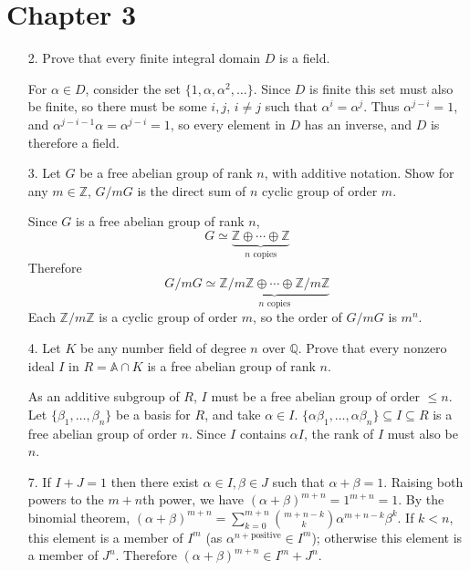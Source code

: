 \documentclass{article}
\newcommand{\Q}[0]{\mathbb{Q}}
\newcommand{\Z}[0]{\mathbb{Z}}
\newcommand{\ringofintegers}[1]{\mathbb{A} \cap #1}
\begin{document}
\section*{Chapter 3}

\begin{enumerate}
\item[2.] Prove that every finite integral domain $D$ is a field.

For $\alpha \in D$, consider the set $\{1, \alpha, \alpha^2, \ldots\}$.  Since $D$ is finite this set must also be finite, so there must be some $i, j$, $i \neq j$ such that $\alpha^i = \alpha^j$.  Thus $\alpha^{j - i} = 1$, and $\alpha^{j - i - 1}\alpha = \alpha^{j - i} = 1$, so every element in $D$ has an inverse, and $D$ is therefore a field.

\item[3.] Let $G$ be a free abelian group of rank $n$, with additive notation.  Show for any $m \in \Z$, $G / mG$ is the direct sum of $n$ cyclic group of order $m$.

Since $G$ is a free abelian group of rank $n$, \[ G \simeq \underbrace{\Z \oplus \cdots \oplus \Z}_\text{$n$ copies} \]
Therefore \[ G/mG \simeq \underbrace{\Z/m\Z \oplus \cdots \oplus \Z/m\Z}_\text{$n$ copies} \]
Each $\Z/m\Z$ is a cyclic group of order $m$, so the order of $G/mG$ is $m^n$.

\item[4.] Let $K$ be any number field of degree $n$ over $\Q$.  Prove that every nonzero ideal $I$ in $R = \ringofintegers{K}$ is a free abelian group of rank $n$.

As an additive subgroup of $R$, $I$ must be a free abelian group of order $\le n$.  Let $\{\beta_1, \ldots, \beta_n\}$ be a basis for $R$, and take $\alpha \in I$.  $\{\alpha\beta_1, \ldots, \alpha\beta_n\} \subseteq I \subseteq R$ is a free abelian group of order $n$.  Since $I$ contains $\alpha I$, the rank of $I$ must also be $n$.

\item[7.] If $I + J = 1$ then there exist $\alpha \in I, \beta \in J$ such that $\alpha + \beta = 1$.  Raising both powers to the $m + n$th power, we have $(\alpha + \beta)^{m + n} = 1^{m + n} = 1$.  By the binomial theorem, $(\alpha + \beta)^{m + n} = \sum_{k = 0}^{m + n} \binom{m + n - k}{k}\alpha^{m + n - k}\beta^{k}$.  If $k < n$, this element is a member of $I^{m}$ (as $\alpha^{n + \text{positive}} \in I^{m}$); otherwise this element is a member of $J^{n}$.  Therefore $(\alpha + \beta)^{m + n} \in I^{m} + J^{n}$.


\end{enumerate}
\end{document}
